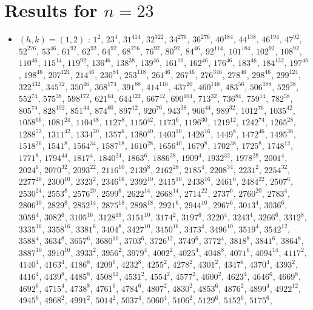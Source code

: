 \section{Results for $n=23$}
\begin{itemize}
\item $(h,k)=(1,2)$ : $1^{2}$, $23^{4}$, $31^{414}$, $32^{322}$, $34^{276}$, $36^{276}$, $40^{184}$, $44^{138}$, $46^{194}$, $47^{92}$, $52^{276}$, $53^{46}$, $61^{92}$, $62^{92}$, $64^{92}$, $68^{276}$, $76^{92}$, $80^{92}$, $84^{46}$, $92^{114}$, $101^{184}$, $102^{92}$, $108^{92}$, $110^{46}$, $115^{14}$, $119^{92}$, $136^{46}$, $138^{38}$, $139^{46}$, $161^{70}$, $162^{46}$, $176^{46}$, $183^{46}$, $184^{132}$, $197^{46}$, $198^{46}$, $207^{124}$, $214^{46}$, $230^{84}$, $253^{118}$, $261^{46}$, $267^{46}$, $276^{346}$, $278^{46}$, $298^{46}$, $299^{124}$, $322^{432}$, $345^{32}$, $350^{46}$, $368^{174}$, $391^{88}$, $414^{116}$, $437^{20}$, $460^{148}$, $483^{56}$, $506^{188}$, $529^{38}$, $552^{74}$, $575^{38}$, $598^{172}$, $621^{64}$, $644^{122}$, $667^{42}$, $690^{104}$, $713^{32}$, $736^{84}$, $759^{14}$, $782^{58}$, $805^{74}$, $828^{102}$, $851^{44}$, $874^{60}$, $897^{12}$, $920^{76}$, $943^{38}$, $966^{44}$, $989^{32}$, $1012^{76}$, $1035^{42}$, $1058^{66}$, $1081^{24}$, $1104^{48}$, $1127^{8}$, $1150^{42}$, $1173^{6}$, $1196^{30}$, $1219^{12}$, $1242^{74}$, $1265^{28}$, $1288^{72}$, $1311^{42}$, $1334^{30}$, $1357^{6}$, $1380^{40}$, $1403^{10}$, $1426^{16}$, $1449^{8}$, $1472^{46}$, $1495^{36}$, $1518^{26}$, $1541^{8}$, $1564^{34}$, $1587^{18}$, $1610^{28}$, $1656^{40}$, $1679^{8}$, $1702^{38}$, $1725^{8}$, $1748^{12}$, $1771^{8}$, $1794^{44}$, $1817^{4}$, $1840^{24}$, $1863^{6}$, $1886^{38}$, $1909^{4}$, $1932^{32}$, $1978^{28}$, $2001^{4}$, $2024^{6}$, $2070^{32}$, $2093^{22}$, $2116^{10}$, $2139^{8}$, $2162^{28}$, $2185^{4}$, $2208^{34}$, $2231^{2}$, $2254^{32}$, $2277^{20}$, $2300^{10}$, $2323^{2}$, $2346^{16}$, $2392^{10}$, $2415^{10}$, $2438^{16}$, $2461^{6}$, $2484^{22}$, $2507^{6}$, $2530^{24}$, $2553^{8}$, $2576^{20}$, $2599^{6}$, $2622^{14}$, $2668^{14}$, $2714^{22}$, $2737^{6}$, $2760^{20}$, $2783^{4}$, $2806^{10}$, $2829^{8}$, $2852^{14}$, $2875^{18}$, $2898^{18}$, $2921^{6}$, $2944^{10}$, $2967^{6}$, $3013^{4}$, $3036^{6}$, $3059^{4}$, $3082^{6}$, $3105^{16}$, $3128^{18}$, $3151^{10}$, $3174^{2}$, $3197^{6}$, $3220^{4}$, $3243^{4}$, $3266^{6}$, $3312^{8}$, $3335^{16}$, $3358^{16}$, $3381^{6}$, $3404^{8}$, $3427^{10}$, $3450^{16}$, $3473^{4}$, $3496^{10}$, $3519^{4}$, $3542^{12}$, $3588^{4}$, $3634^{8}$, $3657^{6}$, $3680^{10}$, $3703^{6}$, $3726^{12}$, $3749^{6}$, $3772^{4}$, $3818^{8}$, $3841^{6}$, $3864^{8}$, $3887^{10}$, $3910^{10}$, $3933^{2}$, $3956^{2}$, $3979^{4}$, $4002^{2}$, $4025^{4}$, $4048^{8}$, $4071^{6}$, $4094^{14}$, $4117^{2}$, $4140^{4}$, $4163^{4}$, $4186^{8}$, $4209^{6}$, $4232^{8}$, $4255^{2}$, $4278^{2}$, $4301^{2}$, $4347^{6}$, $4370^{4}$, $4393^{2}$, $4416^{4}$, $4439^{8}$, $4485^{8}$, $4508^{12}$, $4531^{2}$, $4554^{2}$, $4577^{2}$, $4600^{2}$, $4623^{4}$, $4646^{6}$, $4669^{8}$, $4692^{6}$, $4715^{4}$, $4738^{8}$, $4761^{6}$, $4784^{6}$, $4807^{2}$, $4830^{2}$, $4853^{6}$, $4876^{2}$, $4899^{4}$, $4922^{12}$, $4945^{6}$, $4968^{2}$, $4991^{2}$, $5014^{2}$, $5037^{4}$, $5060^{4}$, $5106^{2}$, $5129^{6}$, $5152^{6}$, $5175^{6}$, 
\end{itemize}

